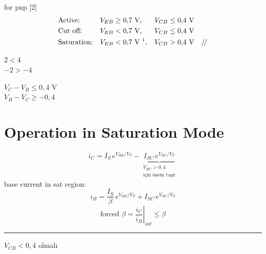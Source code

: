 \documentclass[11pt,a4paper]{article}
\begin{document}
\noindent for pnp
[2]
\begin{align*}
  &\text{Active:} && V_{EB}\geq 0{,}7\ \text{V}, && V_{CB}\leq 0{,}4\ \text{V} \\
  &\text{Cut off:} && V_{EB}<0{,}7\ \text{V}, && V_{CB}\leq 0{,}4\ \text{V} \\
  &\text{Saturation:} && V_{EB}<0{,}7\ \text{V}\ \text{\footnotemark}, && V_{CB}>0{,}4\ \text{V} \quad /\!/
\end{align*}

\noindent
\begin{minipage}[c]{0.3\linewidth}
$2<4$\\
$-2>-4$
\end{minipage}
\begin{minipage}[c]{0.6\linewidth}
$V_C-V_B\leq 0{,}4$ V\\
$V_B-V_C\geq -0{,}4$
\end{minipage}

\section{Operation in Saturation Mode}
\[
  i_C=I_S\,e^{V_{BE}/V_T}-\underbrace{I_{SC}\,e^{V_{BC}/V_T}}_{\substack{V_{BC}>0{,}4\\ \text{için önem taşır}}}
\]
base current in sat region:
\[
  i_B=\frac{I_S}{\beta}\,e^{V_{BE}/V_T}+I_{SC}\,e^{V_{BC}/V_T}
\]
\[
  \text{forced }\beta=\left.\frac{i_C}{i_B}\right|_{sat}\leq\beta
\]
\hrule
\medskip
\noindent $V_{CB}<0{,}4$ olmalı
\end{document}
